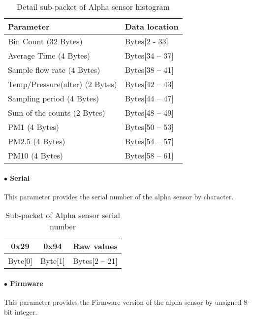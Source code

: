 \begin{table}[h!]
    \centering
    \caption{Detail sub-packet of Alpha sensor histogram}
    \begin{tabular}{|>{\centering\arraybackslash}p{}|>{\centering\arraybackslash}p{}|}
        \hline
        \rowcolor{black!8}
        \textbf{Parameter} & \textbf{Data location}\\ \hline
        Bin Count (32 Bytes) & Bytes[2 - 33] \\ \hline
        Average Time (4 Bytes) & Bytes[34 -- 37] \\ \hline
        Sample flow rate (4 Bytes) & Bytes[38 -- 41] \\ \hline
        Temp/Pressure(alter) (2 Bytes) & Bytes[42 -- 43] \\ \hline
        Sampling period (4 Bytes) & Bytes[44 -- 47] \\ \hline
        Sum of the counts (2 Bytes) & Bytes[48 -- 49] \\ \hline
        PM1 (4 Bytes) & Bytes[50 -- 53] \\ \hline
        PM2.5 (4 Bytes) & Bytes[54 -- 57] \\ \hline
        PM10 (4 Bytes) & Bytes[58 -- 61] \\ \hline
    \end{tabular}
\end{table}



\paragraph{$\bullet$ Serial}
This parameter provides the serial number of the alpha sensor by character.\\


\begin{table}[h!]
    \centering
    \caption{Sub-packet of Alpha sensor serial number}
    \begin{tabular}{|c|c|c|}
        \hline
        \rowcolor{black!8}
        \textbf{0x29} & \textbf{0x94} & \textbf{Raw values}\\
        \hline
        Byte[0] & Byte[1] & Bytes[2 -- 21] \\ \hline
    \end{tabular}
\end{table}


\paragraph{$\bullet$ Firmware}
This parameter provides the Firmware version of the alpha sensor by unsigned 8-bit integer.\\


